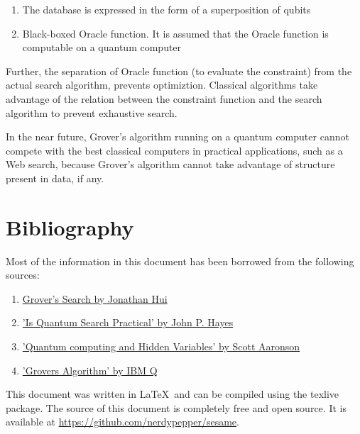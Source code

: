 \documentclass[a4paper]{article}
\begin{document}
\begin{enumerate}
        \item The database is expressed in the form of a superposition of qubits
        \item Black-boxed Oracle function. It is assumed that the Oracle function
            is computable on a quantum computer
\end{enumerate}
\par
Further, the separation of Oracle function (to evaluate the constraint) from the actual
search algorithm, prevents optimiztion. Classical algorithms take advantage of the relation
between the constraint function and the search algorithm to prevent exhaustive search.
\par

In the near future, Grover's algorithm running on a quantum computer cannot compete
with the best classical computers in practical applications, such as a Web search, because
Grover's algorithm cannot take advantage of structure present in data, if any.

\pagebreak


\section{ Bibliography }

Most of the information in this document has been borrowed from the following 
sources:

\begin{enumerate}
    \item \href{https://medium.com/@jonathan_hui/qc-grovers-algorithm-cd81e61cf248}{Grover's Search by Jonathan Hui}
    \item \href{https://web.eecs.umich.edu/~imarkov/pubs/jour/cise05-grov.pdf}{'Is Quantum Search Practical' by John P. Hayes}
    \item \href{https://www.scottaaronson.com/papers/qchvpra.pdf}{'Quantum computing and Hidden Variables' by Scott Aaronson}
    \item \href{https://quantumexperience.ng.bluemix.net/proxy/tutorial/full-user-guide/004-Quantum_Algorithms/}{'Grovers Algorithm' by IBM Q}
\end{enumerate}

This document was written in \LaTeX ~and can be compiled using the texlive package. The 
source of this document is completely free and open source.
It is available at \url{https://github.com/nerdypepper/sesame}.
\end{document}
